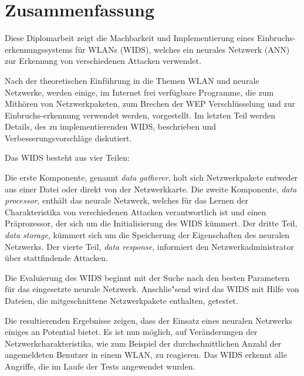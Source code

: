 \chapter*{Zusammenfassung}

Diese Diplomarbeit zeigt die Machbarkeit und Implementierung eines Einbruchs-erkennungssystems f\"ur WLANs (WIDS), welches ein neurales Netzwerk (ANN) zur Erkennung von verschiedenen Attacken verwendet.

Nach der theoretischen Einf\"uhrung in die Themen WLAN und neurale Netzwerke, werden einige, im Internet frei verf\"ugbare Programme, die zum Mith\"oren von Netzwerkpaketen, zum Brechen der WEP Verschl\"usselung und zur Einbruchs-erkennung verwendet werden,  vorgestellt. Im letzten Teil werden Details, des zu implementierenden WIDS, beschrieben und Verbesserungsvorschl\"age diskutiert.

Das WIDS besteht aus vier Teilen:

Die erste Komponente, genannt {\em data gatherer}, holt sich Netzwerkpakete entweder aus einer Datei oder direkt von der Netzwerkkarte. Die zweite Komponente, {\em data processor}, enth\"alt das neurale Netzwerk, welches f\"ur das Lernen der Charakteristika von verschiedenen Attacken verantwortlich ist und einen Pr\"aprozessor, der sich um die Initialisierung des WIDS k\"ummert. Der dritte Teil, {\em data storage}, k\"ummert sich um die Speicherung der Eigenschaften des neuralen Netzwerks. Der vierte Teil, {\em data response}, informiert den Netzwerkadministrator \"uber stattfindende Attacken.

Die Evaluierung des WIDS beginnt mit der Suche nach den besten Parametern f\"ur das eingesetzte neurale Netzwerk. Anschlie"send wird das WIDS mit Hilfe von Dateien, die mitgeschnittene Netzwerkpakete enthalten, getestet.

Die resultierenden Ergebnisse zeigen, dass der Einsatz eines neuralen Netzwerks einiges an Potential bietet. Es ist nun m\"oglich, auf Ver\"anderungen der Netzwerkcharakteristika, wie zum Beispiel der durchschnittlichen Anzahl der angemeldeten Benutzer in einem WLAN, zu reagieren. Das WIDS erkennt alle Angriffe, die im Laufe der Tests angewendet wurden.
